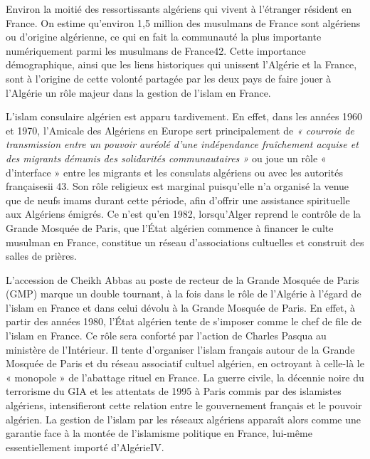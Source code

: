 Environ la moitié des ressortissants algériens qui vivent à l'étranger
résident en France. On estime qu'environ 1,5 million des musulmans de
France sont algériens ou d'origine algérienne, ce qui en fait la
communauté la plus importante numériquement parmi les musulmans de
France42. Cette importance démographique, ainsi que les liens
historiques qui unissent l'Algérie et la France, sont à l'origine de
cette volonté partagée par les deux pays de faire jouer à l'Algérie un
rôle majeur dans la gestion de l'islam en France.

L'islam consulaire algérien est apparu tardivement. En effet, dans les
années 1960 et 1970, l'Amicale des Algériens en Europe sert
principalement de \emph{« courroie de transmission entre un pouvoir
auréolé d'une indépendance fraîchement acquise et des migrants démunis
des solidarités communautaires »} ou joue un rôle
« d'interface » entre les migrants et les consulats algériens ou avec
les autorités françaisesii 43. Son rôle religieux est marginal
puisqu'elle n'a organisé la venue que de neufs imams
durant cette période, afin d'offrir une assistance spirituelle aux
Algériens émigrés. Ce n'est qu'en 1982, lorsqu'Alger reprend le
contrôle de la Grande Mosquée de Paris, que l'État algérien commence à
financer le culte musulman en France, constitue un réseau d'associations
cultuelles et construit des salles de prières.

L'accession de Cheikh Abbas au poste de recteur de la Grande Mosquée de
Paris (GMP) marque un double tournant, à la fois dans le rôle de
l'Algérie à l'égard de l'islam en France et dans celui dévolu à la
Grande Mosquée de Paris. En effet, à partir des années 1980, l'État
algérien tente de s'imposer comme le chef de file de l'islam en France.
Ce rôle sera conforté par l'action de Charles Pasqua au ministère de
l'Intérieur. Il tente d'organiser l'islam français autour de la Grande
Mosquée de Paris et du réseau associatif cultuel algérien, en octroyant
à celle-là le « monopole » de l'abattage rituel en France. La guerre
civile, la décennie noire du terrorisme du GIA et les attentats de 1995
à Paris commis par des islamistes algériens, intensifieront cette
relation entre le gouvernement français et le pouvoir algérien. La
gestion de l'islam par les réseaux algériens apparaît alors comme une
garantie face à la montée de l'islamisme politique en France, lui-même
essentiellement importé d'AlgérieIV.

